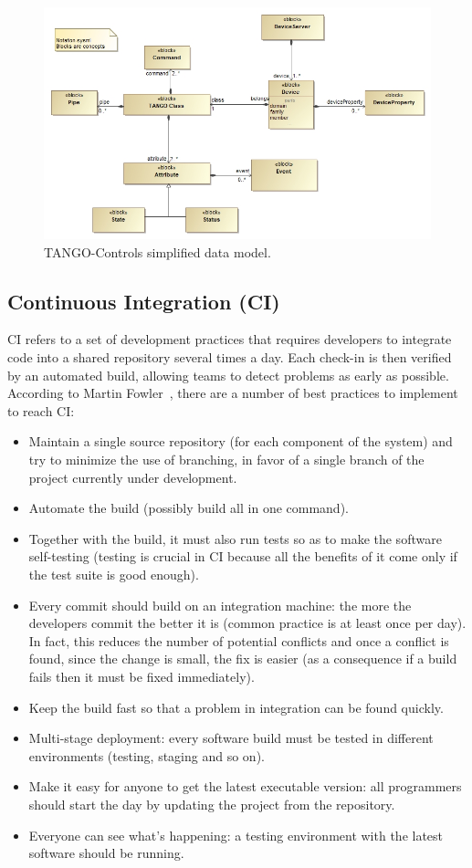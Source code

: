 \documentclass[a4paper]{spie}  %
\begin{document}
\begin{figure}[!htb]
   \centering
   \includegraphics*[width=1\columnwidth]{SimplifiedDataModel}
   \caption{TANGO-Controls simplified data model.}
   \label{fig:tangodatamodel}
\end{figure}

\subsection{Continuous Integration (CI)}
CI refers to a set of development practices that requires developers to integrate code into a shared repository several times a day. Each check-in is then verified by an automated build, allowing teams to detect problems as early as possible.
According to Martin Fowler~\cite{CI}, there are a number of best practices to implement to reach CI:
\begin{itemize}
    \item Maintain a single source repository (for each component of the system) and try to minimize the use of branching, in favor of a single branch of the project currently under development.
    \item Automate the build (possibly build all in one command).
    \item Together with the build, it must also run tests so as to make the software self-testing (testing is crucial in CI because all the benefits of it come only if the test suite is good enough).
    \item Every commit should build on an integration machine: the more the developers commit the better it is (common practice is at least once per day). In fact, this reduces the number of potential conflicts and once a conflict is found, since the change is small, the fix is easier (as a consequence if a build fails then it must be fixed immediately).
    \item Keep the build fast so that a problem in integration can be found quickly.
    \item Multi-stage deployment: every software build must be tested in different environments (testing, staging and so on).
    \item Make it easy for anyone to get the latest executable version: all programmers should start the day by updating the project from the repository.
    \item Everyone can see what’s happening: a testing environment with the latest software should be running.
\end{itemize}
\end{document}
